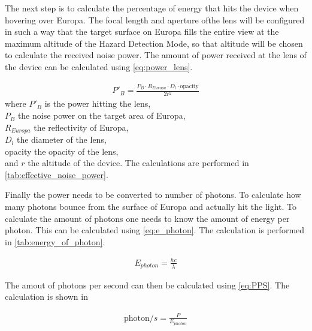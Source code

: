 

The next step is to calculate the percentage of energy that hits the device when hovering over Europa. The focal length and aperture ofthe lens will be configured in such a way that the target surface on Europa fills the entire view at the maximum altitude of the Hazard Detection Mode, so that altitude will be chosen to calculate the received noise power. The amount of power received at the lens of the device can be calculated using \cref{eq:power_lens}.

\begin{align}\label{eq:power_lens}
P'_B = \frac{P_B\cdot R_{Europa}\cdot D_l\cdot \text{opacity}}{2r^2}
\end{align}
where $P'_B$ is the power hitting the lens, \\
$P_B$ the noise power on the target area of Europa,\\
$R_{Europa}$ the reflectivity of Europa,\\
$D_l$ the diameter of the lens,\\
opacity the opacity of the lens,\\
and $r$ the altitude of the device. The calculations are performed in \cref{tab:effective_noise_power}.



Finally the power needs to be converted to number of photons. To calculate how many photons bounce from the surface of Europa and actually hit the light. To calculate the amount of photons one needs to know the amount of energy per photon. This can be calculated using \cref{eq:e_photon}. The calculation is performed in \cref{tab:energy_of_photon}.

\begin{align}\label{eq:e_photon}
E_{photon} = \frac{hc}{\lambda}
\end{align}

 

The amout of photons per second can then be calculated using \cref{eq:PPS}. The calculation is shown in

\begin{align}\label{eq:PPS}
\text{photon}/s = \frac{P}{E_{photon}}
\end{align}













